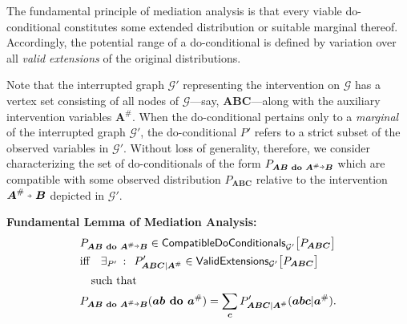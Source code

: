 \documentclass[superscriptaddress,aps,prx,nofootinbib,twocolumn,twoside,reprint,letterpaper,longbibliography]{revtex4-2}
\newcommand{\shortto}[1][3pt]{\mathrel{%
   \hbox{\rule[\dimexpr\fontdimen22\textfont2-.2pt\relax]{#1}{.4pt}}%
   \mkern-4mu\hbox{\usefont{U}{lasy}{m}{n}\symbol{41}}}}
\begin{document}
The fundamental principle of mediation analysis is that every viable do-conditional constitutes some extended distribution or suitable marginal thereof. Accordingly, the potential range of a do-conditional is defined by variation over all \emph{valid extensions} of the original distributions.

Note that the interrupted graph $\mathcal{G}'$ representing the intervention on $\mathcal{G}$ has a vertex set consisting of all nodes of $\mathcal{G}$---say, $\boldsymbol{ABC}$---along with the auxiliary intervention variables $\boldsymbol{A}^\#$. When the do-conditional pertains only to a \emph{marginal} of the interrupted graph $\mathcal{G}'$, the do-conditional $P'$ refers to a strict subset of the observed variables in $\mathcal{G}'$. Without loss of generality, therefore, we consider characterizing the set of do-conditionals of the form $P_{\boldsymbol{AB}\textbf{ do } \boldsymbol{A}^\#\shortto \boldsymbol{B}}$ which are compatible with some observed distribution $P_{\boldsymbol{ABC}}$ relative to the intervention $\boldsymbol{A}^\#\shortto \boldsymbol{B}$ depicted in $\mathcal{G'}$.\par

\medskip
\begin{samepage}
  \noindent\textbf{Fundamental Lemma of Mediation Analysis:}
  \begin{align}\nonumber
    &{P_{\boldsymbol{AB}\textbf{ do } \boldsymbol{A}^\#\shortto \boldsymbol{B}} \in \textsf{CompatibleDoConditionals}_{\mathcal{G'}}\big[P_{\boldsymbol{ABC}}\big]}\\\nonumber
    &\text{iff}\quad\exists_{P'}\::\:\:{P'_{\boldsymbol{ABC}\vert\boldsymbol{A}^\#} \in \textsf{ValidExtensions}_{\mathcal{G'}}\big[P_{\boldsymbol{ABC}}\big]}\\
    &\quad\text{such that}
    \\\nonumber &P_{\boldsymbol{AB}\textbf{ do } \boldsymbol{A}^\#\shortto \boldsymbol{B}}(\boldsymbol{ab}\textbf{ do }\boldsymbol{a}^\#)
    =\sum_{\boldsymbol{c}}P'_{\boldsymbol{ABC}\vert\boldsymbol{A}^\#}({\boldsymbol{abc}\vert\boldsymbol{a}^\#}).
  \end{align}
\end{samepage}
\end{document}
